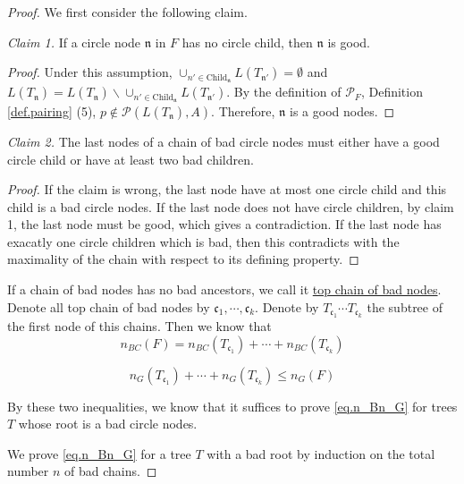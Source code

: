 \begin{proof} We first consider the following claim.
    
\textit{Claim 1.} If a circle node $\mathfrak{n}$ in $F$ has no circle child, then $\mathfrak{n}$ is good.

\begin{proof}
    Under this assumption, $\cup_{n'\in \text{Child}_{\mathfrak{n}}} L(T_{\mathfrak{n}'}) = \emptyset$ and $L(T_{\mathfrak{n}}) = L(T_{\mathfrak{n}})\backslash\cup_{n'\in \text{Child}_{\mathfrak{n}}} L(T_{\mathfrak{n}'})$. By the definition of $\mathcal{P}_F$, Definition \ref{def.pairing} (5), $p\notin\mathcal{P}(L(T_{\mathfrak{n}}), A)$. Therefore, $\mathfrak{n}$ is a good nodes.
\end{proof}


\textit{Claim 2.} The last nodes of a chain of bad circle nodes must either have a good circle child or have at least two bad children.

\begin{proof}
    If the claim is wrong, the last node have at most one circle child and this child is a bad circle nodes. If the last node does not have circle children, by claim 1, the last node must be good, which gives a contradiction. If the last node has exacatly one circle children which is bad, then this contradicts with the maximality of the chain with respect to its defining property.
\end{proof}


If a chain of bad nodes has no bad ancestors, we call it \underline{top chain of bad nodes}. Denote all top chain of bad nodes by $\mathfrak{c}_1, \cdots, \mathfrak{c}_k$. Denote by $T_{\mathfrak{c}_1}\cdots T_{\mathfrak{c}_k}$ the subtree of the first node of this chains. Then we know that 
\begin{equation}
    n_{BC}(F) = n_{BC}(T_{\mathfrak{c}_1}) + \cdots + n_{BC}(T_{\mathfrak{c}_k})
\end{equation}

\begin{equation}
     n_{G}(T_{\mathfrak{c}_1}) + \cdots + n_{G}(T_{\mathfrak{c}_k})\le n_{G}(F)
\end{equation}

By these two inequalities, we know that it suffices to prove \eqref{eq.n_Bn_G} for trees $T$ whose root is a bad circle nodes.

We prove \eqref{eq.n_Bn_G} for a tree $T$ with a bad root by induction on the total number $n$ of bad chains. 


\end{proof}
